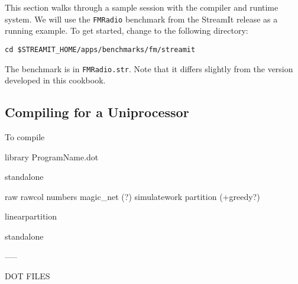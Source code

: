 This section walks through a sample session with the compiler and
runtime system.  We will use the {\tt FMRadio} benchmark from the
StreamIt release as a running example.  To get started, change to the
following directory:
\begin{verbatim}
cd $STREAMIT_HOME/apps/benchmarks/fm/streamit
\end{verbatim}
The benchmark is in {\tt FMRadio.str}.  Note that it differs slightly
from the version developed in this cookbook.

\subsection{Compiling for a Uniprocessor}

To compile 


library
 ProgramName.dot

standalone

raw
rawcol
numbers
magic\_net (?)
simulatework
partition  (+greedy?)

linearpartition

standalone

-----

DOT FILES


